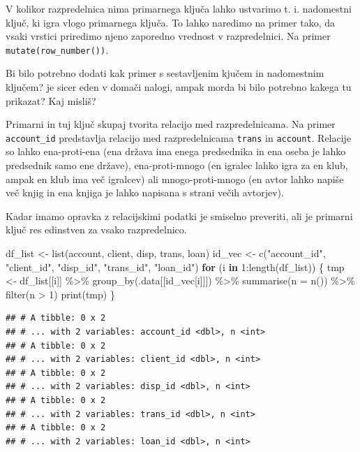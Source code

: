 \documentclass[
]{book}
\newenvironment{Shaded}{\begin{snugshade}}{\end{snugshade}}
\newcommand{\AttributeTok}[1]{\textcolor[rgb]{0.77,0.63,0.00}{#1}}
\newcommand{\ControlFlowTok}[1]{\textcolor[rgb]{0.13,0.29,0.53}{\textbf{#1}}}
\newcommand{\DecValTok}[1]{\textcolor[rgb]{0.00,0.00,0.81}{#1}}
\newcommand{\FunctionTok}[1]{\textcolor[rgb]{0.00,0.00,0.00}{#1}}
\newcommand{\NormalTok}[1]{#1}
\newcommand{\OtherTok}[1]{\textcolor[rgb]{0.56,0.35,0.01}{#1}}
\newcommand{\SpecialCharTok}[1]{\textcolor[rgb]{0.00,0.00,0.00}{#1}}
\newcommand{\StringTok}[1]{\textcolor[rgb]{0.31,0.60,0.02}{#1}}
\begin{document}
V kolikor razpredelnica nima primarnega ključa lahko ustvarimo t. i. nadomestni ključ, ki igra vlogo primarnega ključa. To lahko naredimo na primer tako, da vsaki vrstici priredimo njeno zaporedno vrednost v razpredelnici. Na primer \texttt{mutate(row\_number())}.

{Bi bilo potrebno dodati kak primer s sestavljenim kjučem in nadomestnim ključem? je sicer eden v domači nalogi, ampak morda bi bilo potrebno kakega tu prikazat? Kaj misliš?}

Primarni in tuj ključ skupaj tvorita relacijo med razpredelnicama. Na primer \texttt{account\_id} predstavlja relacijo med razpredelnicama \texttt{trans} in \texttt{account}. Relacije so lahko ena-proti-ena (ena država ima enega predsednika in ena oseba je lahko predsednik samo ene države), ena-proti-mnogo (en igralec lahko igra za en klub, ampak en klub ima več igralcev) ali mnogo-proti-mnogo (en avtor lahko napiše več knjig in ena knjiga je lahko napisana s strani večih avtorjev).

Kadar imamo opravka z relacijskimi podatki je smiselno preveriti, ali je primarni ključ res edinstven za vsako razpredelnico.

\begin{Shaded}
\begin{Highlighting}[]
\NormalTok{df\_list }\OtherTok{\textless{}{-}} \FunctionTok{list}\NormalTok{(account, client, disp, trans, loan)}
\NormalTok{id\_vec  }\OtherTok{\textless{}{-}} \FunctionTok{c}\NormalTok{(}\StringTok{"account\_id"}\NormalTok{, }\StringTok{"client\_id"}\NormalTok{, }\StringTok{"disp\_id"}\NormalTok{, }\StringTok{"trans\_id"}\NormalTok{, }\StringTok{"loan\_id"}\NormalTok{)}
\ControlFlowTok{for}\NormalTok{ (i }\ControlFlowTok{in} \DecValTok{1}\SpecialCharTok{:}\FunctionTok{length}\NormalTok{(df\_list)) \{}
\NormalTok{  tmp }\OtherTok{\textless{}{-}}\NormalTok{ df\_list[[i]] }\SpecialCharTok{\%\textgreater{}\%}
    \FunctionTok{group\_by}\NormalTok{(.data[[id\_vec[i]]]) }\SpecialCharTok{\%\textgreater{}\%}
    \FunctionTok{summarise}\NormalTok{(}\AttributeTok{n =} \FunctionTok{n}\NormalTok{()) }\SpecialCharTok{\%\textgreater{}\%}
    \FunctionTok{filter}\NormalTok{(n }\SpecialCharTok{\textgreater{}} \DecValTok{1}\NormalTok{)}
  \FunctionTok{print}\NormalTok{(tmp)}
\NormalTok{\}}
\end{Highlighting}
\end{Shaded}

\begin{verbatim}
## # A tibble: 0 x 2
## # ... with 2 variables: account_id <dbl>, n <int>
## # A tibble: 0 x 2
## # ... with 2 variables: client_id <dbl>, n <int>
## # A tibble: 0 x 2
## # ... with 2 variables: disp_id <dbl>, n <int>
## # A tibble: 0 x 2
## # ... with 2 variables: trans_id <dbl>, n <int>
## # A tibble: 0 x 2
## # ... with 2 variables: loan_id <dbl>, n <int>
\end{verbatim}
\end{document}
